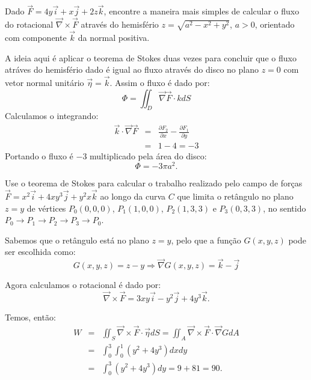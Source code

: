 \begin{exeresol}
 Dado $\vec{F}=4y\vec{i}+x\vec{j}+2z\vec{k}$, encontre a maneira mais simples de calcular o fluxo do rotacional $\vec{\nabla}\times\vec{F}$ através do hemisfério $z=\sqrt{a^2-x^2+y^2}$, $a> 0$, orientado com componente $\vec{k}$ da normal positiva.
\end{exeresol}
\begin{resol}
   A ideia aqui é aplicar o teorema de Stokes duas vezes para concluir que o fluxo atráves do hemisfério dado é igual ao fluxo através do disco no plano $z=0$ com vetor normal unitário $\vec{\eta}=\vec{k}$. Assim o fluxo é dado por:
   $$\Phi=\iint_D \vec{\nabla}\vec{F}\cdot{k}dS $$
   Calculamos o integrando:
 \begin{eqnarray*}
 \vec{k}\cdot\vec{\nabla}\vec{F} &=& \frac{\partial F_2}{\partial x} - \frac{\partial F_1}{\partial y} \\
 &=& 1-4=-3
 \end{eqnarray*}
 Portando o fluxo é $-3$ multiplicado pela área do disco:
 $$\Phi=-3\pi a^2. $$
\end{resol}
\begin{exeresol}
Use o teorema de Stokes para calcular o trabalho realizado pelo campo de forças $\vec{F}=x^2\vec{i}+4xy^3\vec{j}+y^2x\vec{k}$ ao longo da curva $C$ que limita o retângulo no plano $z=y$ de vértices $P_0(0,0,0)$, $P_1(1,0,0)$, $P_2(1,3,3)$ e $P_3(0,3,3)$, no sentido $P_0\to P_1\to P_2\to P_3\to P_0$.
\end{exeresol}
\begin{resol}
  Sabemos que o retângulo está no plano $z=y$, pelo que a função $G(x,y,z)$ pode ser escolhida como:
  $$G(x,y,z) = z-y \Longrightarrow \vec{\nabla}G(x,y,z) = \vec{k}-\vec{j}$$

 Agora calculamos o rotacional é dado por:
 $$\vec{\nabla}\times \vec{F} = 3xy\vec{i} -y^2\vec{j}+4y^3\vec{k}.$$
 
 Temos, então:
 \begin{eqnarray*}
   W &=& \iint_S\vec{\nabla}\times \vec{F}\cdot \vec{\eta}dS = \iint_A\vec{\nabla}\times \vec{F}\cdot \vec{\nabla}GdA\\
   &=&\int_0^3\int_0^1\left(y^2+4y^3\right)dx dy\\
   &=&\int_0^3\left(y^2+4y^3\right)dy = 9+ 81=90.
\end{eqnarray*}

\end{resol}


